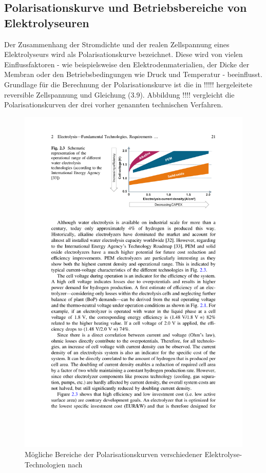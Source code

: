 \subsection{Polarisationskurve und Betriebsbereiche von Elektrolyseuren}
\label{subsec:Polarisationskurve}
Der Zusammenhang der Stromdichte und der realen Zellspannung eines Elektrolyseurs wird als Polarisationskurve bezeichnet. Diese wird von vielen Einflussfaktoren - wie beispielsweise den Elektrodenmaterialien, der Dicke der Membran oder den Betriebsbedingungen wie Druck und Temperatur - beeinflusst. Grundlage für die Berechnung der Polarisationskurve ist die in !!!!! hergeleitete reversible Zellspannung und Gleichung (3.9). Abbildung !!!! vergleicht die Polarisationskurven der drei vorher genannten technischen Verfahren. 
\begin{figure}[h]
	\centering
		\includegraphics[scale=1]{Figures/PolarisationskurvenElektrolyseure}
		\caption{Mögliche Bereiche der Polarisationskurven verschiedener Elektrolyse-Technologien nach \cite{https://doi.org/10.1007/978-3-319-72459-1}}
\label{fig:PolarisationskurveElektrolyseure}	
\end{figure}

